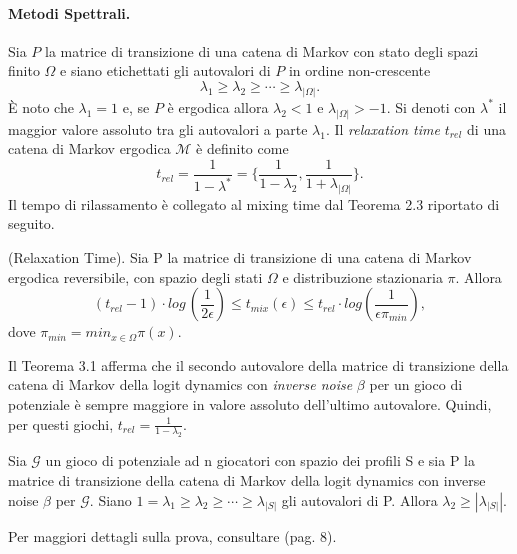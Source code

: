 \paragraph{Metodi Spettrali.} Sia $P$ la matrice di transizione di una catena di Markov con stato degli spazi finito $\Omega$ e siano etichettati gli autovalori di $P$ in ordine non-crescente
\begin{equation}
	\lambda_1 \geq \lambda_2 \geq \cdots \geq \lambda_{|\Omega|}.\nonumber
\end{equation}
È noto che $\lambda_1 = 1$ e, se $P$ è ergodica allora $\lambda_2 < 1$ e $\lambda_{|\Omega|} > -1$. Si denoti con $\lambda^*$ il maggior valore assoluto tra gli autovalori a parte $\lambda_1$. Il \textit{relaxation time} $t_{rel}$ di una catena di Markov ergodica $\mathcal{M}$ è definito come
\begin{equation}
	t_{rel} = \frac{1}{1 - \lambda^*} = \lbrace \frac{1}{1 - \lambda_2}, \frac{1}{1 + \lambda_{|\Omega|}}\rbrace.\nonumber
\end{equation}
Il tempo di rilassamento è collegato al mixing time dal Teorema 2.3 riportato di seguito.
\begin{thm}
	[2.3] (Relaxation Time). Sia P la matrice di transizione di una catena di Markov ergodica reversibile, con spazio degli stati $\Omega$ e distribuzione stazionaria $\pi$. Allora
	\begin{equation}
		(t_{rel} - 1) \cdot log\,\left(\frac{1}{2\epsilon}\right) \leq t_{mix}(\epsilon) \leq t_{rel} \cdot log\left(\frac{1}{\epsilon \pi_{min}}\right),
	\end{equation}
	dove $\pi_{min} = min_{x\in\Omega}\pi(x)$.
\end{thm}
Il Teorema 3.1 afferma che il secondo autovalore della matrice di transizione della catena di Markov della logit dynamics con \textit{inverse noise} $\beta$ per un gioco di potenziale è sempre maggiore in valore assoluto dell'ultimo autovalore. Quindi, per questi giochi, $t_{rel} = \frac{1}{1 - \lambda_2}$.\\
\begin{thm}
	[3.1] Sia $\mathcal{G}$ un gioco di potenziale ad n giocatori con spazio dei profili S e sia P la matrice di transizione della catena di Markov della logit dynamics con inverse noise $\beta$ per $\mathcal{G}$. Siano $1 = \lambda_1 \geq \lambda_2 \geq \cdots \geq \lambda_{|S|}$ gli autovalori di P. Allora $\lambda_2 \geq |\lambda_|S||$.
\end{thm}
Per maggiori dettagli sulla prova, consultare \cite{auletta2011convergence} (pag. 8).\\
